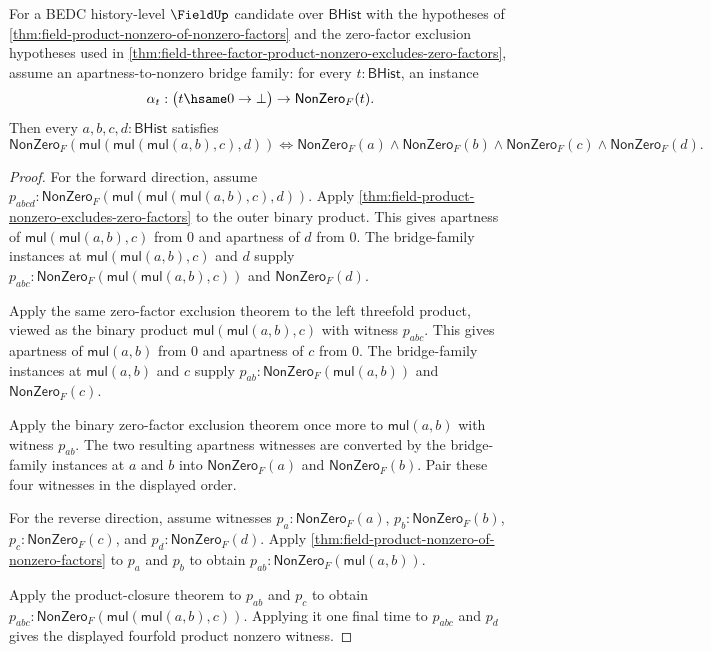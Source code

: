 \begin{theorem}
\label{thm:field-four-factor-product-nonzero-iff-factors}
For a BEDC history-level $\FieldUp$ candidate over $\mathsf{BHist}$ with the
hypotheses of \autoref{thm:field-product-nonzero-of-nonzero-factors} and the
zero-factor exclusion hypotheses used in
\autoref{thm:field-three-factor-product-nonzero-excludes-zero-factors}, assume
an apartness-to-nonzero bridge family: for every $t:\mathsf{BHist}$, an
instance
$$
\alpha_t:\bigl(t\hsame0\to\bot\bigr)\to\mathsf{NonZero}_F(t).
$$
Then every $a,b,c,d:\mathsf{BHist}$ satisfies
$$
\mathsf{NonZero}_F(\mathsf{mul}(\mathsf{mul}(\mathsf{mul}(a,b),c),d))
\Longleftrightarrow
\mathsf{NonZero}_F(a)\wedge\mathsf{NonZero}_F(b)\wedge
\mathsf{NonZero}_F(c)\wedge\mathsf{NonZero}_F(d).
$$
\end{theorem}
\begin{proof}
For the forward direction, assume
$p_{abcd}:\mathsf{NonZero}_F(\mathsf{mul}(\mathsf{mul}(\mathsf{mul}(a,b),c),d))$.
Apply \autoref{thm:field-product-nonzero-excludes-zero-factors} to the outer
binary product. This gives apartness of
$\mathsf{mul}(\mathsf{mul}(a,b),c)$ from $0$ and apartness of $d$ from $0$.
The bridge-family instances at $\mathsf{mul}(\mathsf{mul}(a,b),c)$ and $d$
supply
$p_{abc}:\mathsf{NonZero}_F(\mathsf{mul}(\mathsf{mul}(a,b),c))$ and
$\mathsf{NonZero}_F(d)$.

Apply the same zero-factor exclusion theorem to the left threefold product,
viewed as the binary product $\mathsf{mul}(\mathsf{mul}(a,b),c)$ with witness
$p_{abc}$. This gives apartness of $\mathsf{mul}(a,b)$ from $0$ and apartness
of $c$ from $0$. The bridge-family instances at $\mathsf{mul}(a,b)$ and $c$
supply
$p_{ab}:\mathsf{NonZero}_F(\mathsf{mul}(a,b))$ and $\mathsf{NonZero}_F(c)$.

Apply the binary zero-factor exclusion theorem once more to
$\mathsf{mul}(a,b)$ with witness $p_{ab}$. The two resulting apartness
witnesses are converted by the bridge-family instances at $a$ and $b$ into
$\mathsf{NonZero}_F(a)$ and $\mathsf{NonZero}_F(b)$. Pair these four witnesses
in the displayed order.

For the reverse direction, assume witnesses
$p_a:\mathsf{NonZero}_F(a)$, $p_b:\mathsf{NonZero}_F(b)$,
$p_c:\mathsf{NonZero}_F(c)$, and $p_d:\mathsf{NonZero}_F(d)$. Apply
\autoref{thm:field-product-nonzero-of-nonzero-factors} to $p_a$ and $p_b$ to
obtain $p_{ab}:\mathsf{NonZero}_F(\mathsf{mul}(a,b))$.

Apply the product-closure theorem to $p_{ab}$ and $p_c$ to obtain
$p_{abc}:\mathsf{NonZero}_F(\mathsf{mul}(\mathsf{mul}(a,b),c))$. Applying it
one final time to $p_{abc}$ and $p_d$ gives the displayed fourfold product
nonzero witness.
\end{proof}

